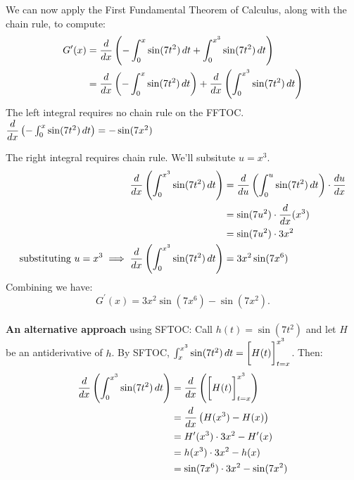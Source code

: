 \documentclass{ximera}
\begin{document}
\begin{problem}
\begin{enumerate}
\begin{explanation}
      We can now apply the First Fundamental Theorem of Calculus, along with the chain rule, to compute:
      \begin{align*}
        G^\prime (x) &= \dfrac{d}{dx} \left( - \int^x_0 \sin(7t^2) \,d t + \int_0^{x^3} \sin(7t^2) \,d t \right)  \\
                     &= \dfrac{d}{dx} \left( - \int^x_0 \sin(7t^2) \,d t \right) + \dfrac{d}{dx} \left( \int_0^{x^3} \sin(7t^2) \,d t \right)  
        \end{align*}
        The left integral requires no chain rule on the FFTOC.  $ \dfrac{d}{dx} \left( - \int^x_0 \sin(7t^2) \,d t \right)=-\sin(7x^2)\\$
        
        The right integral requires chain rule.  We'll subsitute $u=x^3$.
        \begin{align*}
       \dfrac{d}{dx} \left( \int_0^{x^3} \sin(7t^2) \,d t \right) &= \dfrac{d}{du} \left( \int_0^{u} \sin(7t^2) \,d t \right) \cdot \dfrac{du}{dx}\\
                                 &=\sin(7u^2) \cdot \dfrac{d}{dx}(x^3)\\
                                 &=\sin(7u^2) \cdot 3x^2\\
 	\text{substituting}\ u=x^3  \implies \dfrac{d}{dx} \left( \int_0^{x^3} \sin(7t^2) \,d t \right) &=3x^2 \sin(7x^6)
           \end{align*}
           Combining we have: 
                  $$G^\prime (x) = 3x^2 \sin(7x^6) - \sin(7x^2).$$ \\[2em]


	\textbf{An alternative approach} using SFTOC:
	Call $h(t) = \sin(7t^2)$ and let $H$ be an antiderivative of $h$. By SFTOC, $\int_x^{x^3} \sin(7t^2) \,d t = \bigg[ H(t) \bigg]_{t=x}^{x^3}$.
	Then:
	\begin{align*}
		\dfrac{d}{dx} \left( \int_0^{x^3} \sin(7t^2) \,d t \right)  &= \dfrac{d}{dx} \left( \bigg[ H(t) \bigg]_{t=x}^{x^3} \right)\\
			&= \dfrac{d}{dx} \left( H(x^3) - H(x) \right) \\
			&= H'(x^3) \cdot 3x^2 - H'(x)\\
			&= h(x^3)\cdot 3x^2 - h(x)\\
			&= \sin(7x^6) \cdot 3x^2 - \sin(7x^2)
	\end{align*} 
    \end{explanation}
    \end{enumerate}
\end{problem}
\end{document}
